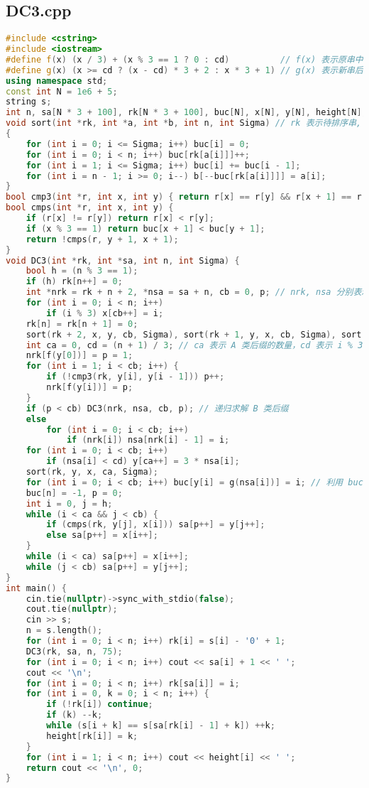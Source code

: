 \documentclass[9pt, a4paper, oneside]{book}
\begin{document}
\subsection{DC3.cpp}
\begin{lstlisting}[language={C++}]
#include <cstring>
#include <iostream>
#define f(x) (x / 3) + (x % 3 == 1 ? 0 : cd)          // f(x) 表示原串中后缀 x 在新串中的位置
#define g(x) (x >= cd ? (x - cd) * 3 + 2 : x * 3 + 1) // g(x) 表示新串后缀 x  在原串中的位置
using namespace std;
const int N = 1e6 + 5;
string s;
int n, sa[N * 3 + 100], rk[N * 3 + 100], buc[N], x[N], y[N], height[N];
void sort(int *rk, int *a, int *b, int n, int Sigma) // rk 表示待排序串, a 表示指标集, b 表示排序后的指标顺序
{
    for (int i = 0; i <= Sigma; i++) buc[i] = 0;
    for (int i = 0; i < n; i++) buc[rk[a[i]]]++;
    for (int i = 1; i <= Sigma; i++) buc[i] += buc[i - 1];
    for (int i = n - 1; i >= 0; i--) b[--buc[rk[a[i]]]] = a[i];
}
bool cmp3(int *r, int x, int y) { return r[x] == r[y] && r[x + 1] == r[y + 1] && r[x + 2] == r[y + 2]; }
bool cmps(int *r, int x, int y) {
    if (r[x] != r[y]) return r[x] < r[y];
    if (x % 3 == 1) return buc[x + 1] < buc[y + 1];
    return !cmps(r, y + 1, x + 1);
}
void DC3(int *rk, int *sa, int n, int Sigma) {
    bool h = (n % 3 == 1);
    if (h) rk[n++] = 0;
    int *nrk = rk + n + 2, *nsa = sa + n, cb = 0, p; // nrk, nsa 分别表示新的 rk 和 sa, cb 表示 B 类后缀的数量
    for (int i = 0; i < n; i++)
        if (i % 3) x[cb++] = i;
    rk[n] = rk[n + 1] = 0;
    sort(rk + 2, x, y, cb, Sigma), sort(rk + 1, y, x, cb, Sigma), sort(rk, x, y, cb, Sigma); // 指标顺序存在了 y 中
    int ca = 0, cd = (n + 1) / 3; // ca 表示 A 类后缀的数量，cd 表示 i % 3 = 1 的后缀的数量
    nrk[f(y[0])] = p = 1;
    for (int i = 1; i < cb; i++) {
        if (!cmp3(rk, y[i], y[i - 1])) p++;
        nrk[f(y[i])] = p;
    }
    if (p < cb) DC3(nrk, nsa, cb, p); // 递归求解 B 类后缀
    else
        for (int i = 0; i < cb; i++)
            if (nrk[i]) nsa[nrk[i] - 1] = i;
    for (int i = 0; i < cb; i++)
        if (nsa[i] < cd) y[ca++] = 3 * nsa[i];
    sort(rk, y, x, ca, Sigma);
    for (int i = 0; i < cb; i++) buc[y[i] = g(nsa[i])] = i; // 利用 buc 存 B 类后缀的排名
    buc[n] = -1, p = 0;
    int i = 0, j = h;
    while (i < ca && j < cb) {
        if (cmps(rk, y[j], x[i])) sa[p++] = y[j++];
        else sa[p++] = x[i++];
    }
    while (i < ca) sa[p++] = x[i++];
    while (j < cb) sa[p++] = y[j++];
}
int main() {
    cin.tie(nullptr)->sync_with_stdio(false);
    cout.tie(nullptr);
    cin >> s;
    n = s.length();
    for (int i = 0; i < n; i++) rk[i] = s[i] - '0' + 1;
    DC3(rk, sa, n, 75);
    for (int i = 0; i < n; i++) cout << sa[i] + 1 << ' ';
    cout << '\n';
    for (int i = 0; i < n; i++) rk[sa[i]] = i;
    for (int i = 0, k = 0; i < n; i++) {
        if (!rk[i]) continue;
        if (k) --k;
        while (s[i + k] == s[sa[rk[i] - 1] + k]) ++k;
        height[rk[i]] = k;
    }
    for (int i = 1; i < n; i++) cout << height[i] << ' ';
    return cout << '\n', 0;
}\end{lstlisting}
\end{document}
